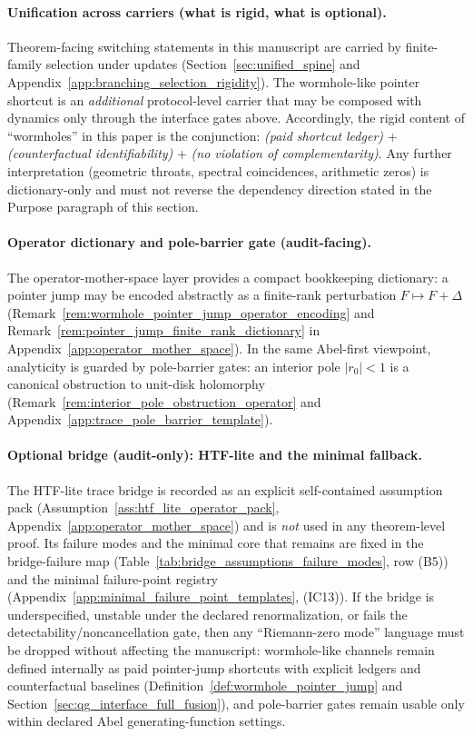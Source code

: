 \paragraph{Unification across carriers (what is rigid, what is optional).}
\AuditTag Theorem-facing switching statements in this manuscript are carried by finite-family selection under updates (Section~\ref{sec:unified_spine} and Appendix~\ref{app:branching_selection_rigidity}).
The wormhole-like pointer shortcut is an \emph{additional} protocol-level carrier that may be composed with dynamics only through the interface gates above.
Accordingly, the rigid content of ``wormholes'' in this paper is the conjunction:
\emph{(paid shortcut ledger)} + \emph{(counterfactual identifiability)} + \emph{(no violation of complementarity)}.
Any further interpretation (geometric throats, spectral coincidences, arithmetic zeros) is dictionary-only and must not reverse the dependency direction stated in the Purpose paragraph of this section.

\paragraph{Operator dictionary and pole-barrier gate (audit-facing).}
\AuditTag The operator-mother-space layer provides a compact bookkeeping dictionary:
a pointer jump may be encoded abstractly as a finite-rank perturbation $F\mapsto F+\Delta$
(Remark~\ref{rem:wormhole_pointer_jump_operator_encoding} and Remark~\ref{rem:pointer_jump_finite_rank_dictionary} in Appendix~\ref{app:operator_mother_space}).
In the same Abel-first viewpoint, analyticity is guarded by pole-barrier gates:
an interior pole $|r_0|<1$ is a canonical obstruction to unit-disk holomorphy
(Remark~\ref{rem:interior_pole_obstruction_operator} and Appendix~\ref{app:trace_pole_barrier_template}).

\paragraph{Optional bridge (audit-only): HTF-lite and the minimal fallback.}
\AuditTag The HTF-lite trace bridge is recorded as an explicit self-contained assumption pack
(Assumption~\ref{ass:htf_lite_operator_pack}, Appendix~\ref{app:operator_mother_space}) and is \emph{not} used in any theorem-level proof.
Its failure modes and the minimal core that remains are fixed in the bridge-failure map
(Table~\ref{tab:bridge_assumptions_failure_modes}, row (B5))
and the minimal failure-point registry (Appendix~\ref{app:minimal_failure_point_templates}, (IC13)).
If the bridge is underspecified, unstable under the declared renormalization, or fails the detectability/noncancellation gate,
then any ``Riemann-zero mode'' language must be dropped without affecting the manuscript:
wormhole-like channels remain defined internally as paid pointer-jump shortcuts with explicit ledgers and counterfactual baselines
(Definition~\ref{def:wormhole_pointer_jump} and Section~\ref{sec:qg_interface_full_fusion}),
and pole-barrier gates remain usable only within declared Abel generating-function settings.

